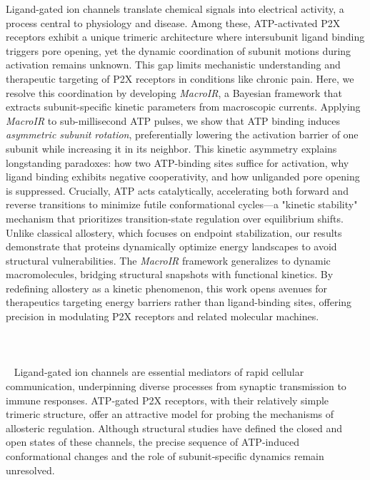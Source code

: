 \documentclass[a4paper,12pt]{article}
\begin{document}
		Ligand-gated ion channels translate chemical signals into electrical activity, a process central to physiology and disease. Among these, ATP-activated P2X receptors exhibit a unique trimeric architecture where intersubunit ligand binding triggers pore opening, yet the dynamic coordination of subunit motions during activation remains unknown. This gap limits mechanistic understanding and therapeutic targeting of P2X receptors in conditions like chronic pain. Here, we resolve this coordination by developing \textit{MacroIR}, a Bayesian framework that extracts subunit-specific kinetic parameters from macroscopic currents. Applying \textit{MacroIR} to sub-millisecond ATP pulses, we show that ATP binding induces \textit{asymmetric subunit rotation}, preferentially lowering the activation barrier of one subunit while increasing it in its neighbor. This kinetic asymmetry explains longstanding paradoxes: how two ATP-binding sites suffice for activation, why ligand binding exhibits negative cooperativity, and how unliganded pore opening is suppressed. Crucially, ATP acts catalytically, accelerating both forward and reverse transitions to minimize futile conformational cycles—a "kinetic stability" mechanism that prioritizes transition-state regulation over equilibrium shifts. Unlike classical allostery, which focuses on endpoint stabilization, our results demonstrate that proteins dynamically optimize energy landscapes to avoid structural vulnerabilities. The \textit{MacroIR} framework generalizes to dynamic macromolecules, bridging structural snapshots with functional kinetics. By redefining allostery as a kinetic phenomenon, this work opens avenues for therapeutics targeting energy barriers rather than ligand-binding sites, offering precision in modulating P2X receptors and related molecular machines.\\\\\\\\\ %
Ligand‐gated ion channels are essential mediators of rapid cellular communication, underpinning diverse processes from synaptic transmission to immune responses. ATP‐gated P2X receptors, with their relatively simple trimeric structure, offer an attractive model for probing the mechanisms of allosteric regulation. Although structural studies have defined the closed and open states of these channels, the precise sequence of ATP‐induced conformational changes and the role of subunit‐specific dynamics remain unresolved.  
\end{document}
